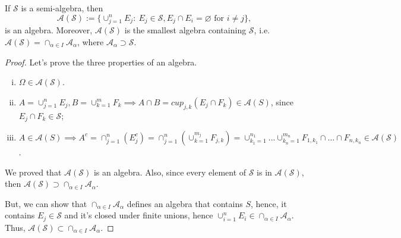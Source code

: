 \begin{proposition}
	If $\mathcal S$ is a semi-algebra, then
	\begin{displaymath}
		\mathcal A(\mathcal S):=
		\{
		\cup^n_{j=1} E_j : \
		E_j \in \mathcal S, E_j \cap E_i = \varnothing \text{ for }
		i\neq j
		\},
	\end{displaymath}
	is an algebra.
	Moreover, $\mathcal A(\mathcal S)$ is the smallest algebra containing $\mathcal S$,
	i.e. $\mathcal A(\mathcal S)=\cap_{\alpha \in I} \mathcal A_\alpha$, where
	$\mathcal A_\alpha \supset \mathcal S$.
\end{proposition}
\begin{proof}

	Let's prove the three properties of an algebra.

	\begin{enumerate}[(i)]
		\item $\Omega \in \mathcal A(\mathcal S)$.
		\item $A= \cup^n_{j=1} E_j, B= \cup^m_{k=1} F_k \implies A\cap B = cup_{j,k} (E_j \cap F_k) \in \mathcal A(S)$,
		      since $E_j \cap F_k \in \mathcal S$;
		\item $A \in \mathcal A(S)\implies A^c =
			      \cap^n_{j=1}(E_j^c) =
			      \cap^n_{j=1}(\cup^{m_j}_{k=1}F_{j,k}) =
			      \cup^{n_1}_{k_1=1}...\cup^{m_n}_{k_n=1} F_{1,k_1} \cap ... \cap F_{n,k_n} \in \mathcal A(\mathcal S)$.
	\end{enumerate}
	We proved that $\mathcal A(\mathcal S)$ is an algebra. Also, since every element of
	$\mathcal S$ is in $\mathcal A(\mathcal S)$, then
	$\mathcal A(\mathcal S) \supset \cap_{\alpha \in I} \mathcal A_\alpha$.

	But, we can show that $\cap_{\alpha \in I} \mathcal A_\alpha$ defines an algebra that contains $S$,
	hence, it contains $E_j \in \mathcal S$ and it's closed under finite unions,
	hence $\cup^n_{i=1}E_i \in \cap_{\alpha \in I} \mathcal A_\alpha$. Thus,
	$\mathcal A(\mathcal S) \subset \cap_{\alpha \in I} \mathcal A_\alpha$.

\end{proof}

